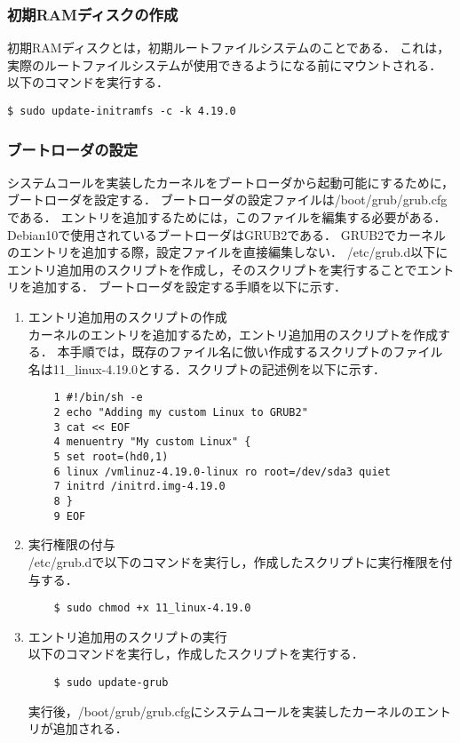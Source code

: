 \documentclass[12pt]{jsarticle}
\begin{document}
\subsubsection{初期RAMディスクの作成}
初期RAMディスクとは，初期ルートファイルシステムのことである．
これは，実際のルートファイルシステムが使用できるようになる前にマウントされる．
以下のコマンドを実行する．
\begin{verbatim}
$ sudo update-initramfs -c -k 4.19.0
\end{verbatim}

\subsubsection{ブートローダの設定}
システムコールを実装したカーネルをブートローダから起動可能にするために，ブートローダを設定する．
ブートローダの設定ファイルは/boot/grub/grub.cfgである．
エントリを追加するためには，このファイルを編集する必要がある．
Debian10で使用されているブートローダはGRUB2である．
GRUB2でカーネルのエントリを追加する際，設定ファイルを直接編集しない．
/etc/grub.d以下にエントリ追加用のスクリプトを作成し，そのスクリプトを実行することでエントリを追加する．
ブートローダを設定する手順を以下に示す．
\begin{enumerate}
\item エントリ追加用のスクリプトの作成\\
	カーネルのエントリを追加するため，エントリ追加用のスクリプトを作成する．
	本手順では，既存のファイル名に倣い作成するスクリプトのファイル名は11\_linux-4.19.0とする．スクリプトの記述例を以下に示す．
	\begin{verbatim}
	1 #!/bin/sh -e
	2 echo "Adding my custom Linux to GRUB2"
	3 cat << EOF
	4 menuentry "My custom Linux" {
	5 set root=(hd0,1)
	6 linux /vmlinuz-4.19.0-linux ro root=/dev/sda3 quiet
	7 initrd /initrd.img-4.19.0
	8 }
	9 EOF
	\end{verbatim}

\item 実行権限の付与\\
	/etc/grub.dで以下のコマンドを実行し，作成したスクリプトに実行権限を付与する．
	\begin{verbatim}
	$ sudo chmod +x 11_linux-4.19.0
	\end{verbatim}
	
\item エントリ追加用のスクリプトの実行\\
	以下のコマンドを実行し，作成したスクリプトを実行する．
	\begin{verbatim}
	$ sudo update-grub
	\end{verbatim}
	実行後，/boot/grub/grub.cfgにシステムコールを実装したカーネルのエントリが追加される．

\end{enumerate}
\end{document}
